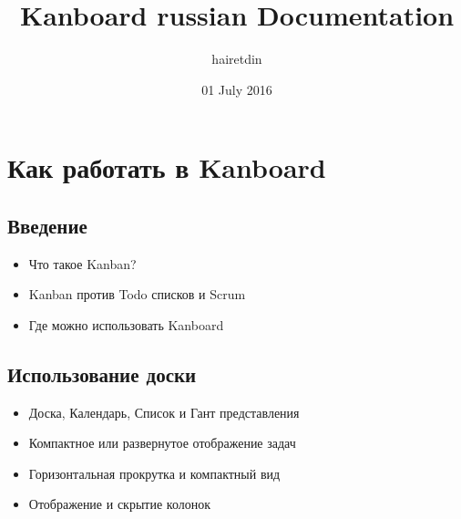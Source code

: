 \documentclass[letterpaper,10pt,russian]{sphinxmanual}
\title{Kanboard russian Documentation}
\date{01 July 2016}
\author{hairetdin}
\begin{document}
\maketitle
\tableofcontents
{}\label{index::doc}



\chapter{Как работать в Kanboard}
\label{index:using-kanboard}\label{index:documentation}

\section{Введение}
\label{index:introduction}\begin{itemize}
\item {} 
Что такое Kanban?

\item {} 
Kanban против Todo списков и Scrum

\item {} 
Где можно использовать Kanboard

\end{itemize}


\section{Использование доски}
\label{index:using-the-board}\begin{itemize}
\item {} 
Доска, Календарь, Список и Гант представления

\item {} 
Компактное или развернутое отображение задач

\item {} 
Горизонтальная прокрутка и компактный вид

\item {} 
Отображение и скрытие колонок

\end{itemize}
\end{document}
